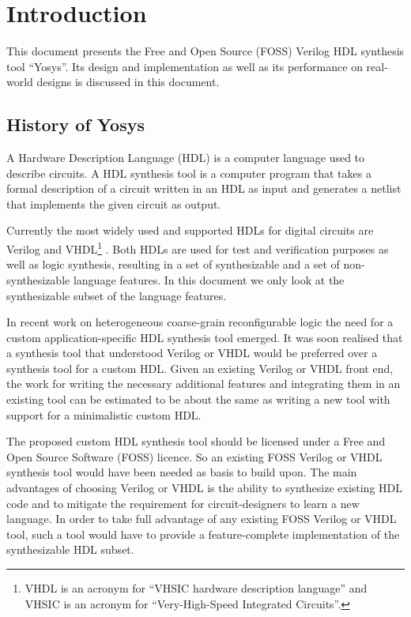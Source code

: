 
\chapter{Introduction}
\label{chapter:intro}

This document presents the Free and Open Source (FOSS) Verilog HDL synthesis tool ``Yosys''.
Its design and implementation as well as its performance on real-world designs
is discussed in this document.

\section{History of Yosys}

A Hardware Description Language (HDL) is a computer language used to describe
circuits. A HDL synthesis tool is a computer program that takes a formal
description of a circuit written in an HDL as input and generates a netlist
that implements the given circuit as output.

Currently the most widely used and supported HDLs for digital circuits are
Verilog \cite{Verilog2005}\cite{VerilogSynth} and
VHDL\footnote{VHDL is an acronym for ``VHSIC hardware description language''
and VHSIC is an acronym for ``Very-High-Speed Integrated
Circuits''.} \cite{VHDL}\cite{VHDLSynth}.
Both HDLs are used for test and verification purposes as well as logic
synthesis, resulting in a set of synthesizable and a set of non-synthesizable
language features. In this document we only look at the synthesizable subset
of the language features.

In recent work on heterogeneous coarse-grain reconfigurable
logic \cite{intersynth} the need for a custom application-specific HDL synthesis
tool emerged. It was soon realised that a synthesis tool that understood Verilog
or VHDL would be preferred over a synthesis tool for a custom HDL. Given an
existing Verilog or VHDL front end, the work for writing the necessary
additional features and integrating them in an existing tool can be estimated to be
about the same as writing a new tool with support for a minimalistic custom HDL.

The proposed custom HDL synthesis tool should be licensed under a Free
and Open Source Software (FOSS) licence. So an existing FOSS Verilog or VHDL
synthesis tool would have been needed as basis to build upon. The main advantages
of choosing Verilog or VHDL is the ability to synthesize existing HDL code and
to mitigate the requirement for circuit-designers to learn a new language. In order to take full advantage of any existing FOSS Verilog or VHDL tool, 
such a tool would have to provide a feature-complete implementation of the
synthesizable HDL subset.

